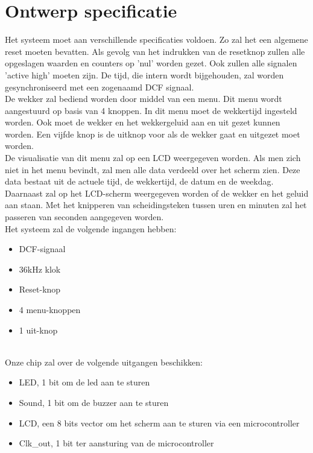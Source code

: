 \chapter{Ontwerp specificatie}
Het systeem moet aan verschillende specificaties voldoen. Zo zal het een algemene reset moeten bevatten. Als gevolg van het indrukken van de resetknop zullen alle opgeslagen waarden en counters op 'nul' worden gezet. Ook zullen alle signalen 'active high' moeten zijn. De tijd, die intern wordt bijgehouden, zal worden gesynchroniseerd met een zogenaamd DCF signaal.\\
De wekker zal bediend worden door middel van een menu. Dit menu wordt aangestuurd op basis van 4 knoppen. In dit menu moet de wekkertijd ingesteld worden. Ook moet de wekker en het wekkergeluid aan en uit gezet kunnen worden. Een vijfde knop is de uitknop voor als de wekker gaat en uitgezet moet worden.\\
De visualisatie van dit menu zal op een LCD weergegeven worden. Als men zich niet in het menu bevindt, zal men alle data verdeeld over het scherm zien. Deze data bestaat uit de actuele tijd, de wekkertijd, de datum en de weekdag. Daarnaast zal op het LCD-scherm weergegeven worden of de wekker en het geluid aan staan. Met het knipperen van scheidingsteken tussen uren en minuten zal het passeren van seconden aangegeven worden.\\
Het systeem zal de volgende ingangen hebben:
\begin{itemize}[nolistsep]
\item	DCF-signaal
\item	36kHz klok
\item	Reset-knop
\item	4 menu-knoppen
\item 1 uit-knop
\end{itemize}

\noindent
\\
Onze chip zal over de volgende uitgangen beschikken:
\begin{itemize}[nolistsep]
\item	LED, 1 bit om de led aan te sturen
\item	Sound, 1 bit om de buzzer aan te sturen
\item	LCD, een 8 bits vector om het scherm aan te sturen via een microcontroller
\item  Clk\_out, 1 bit ter aansturing van de microcontroller
\end{itemize}
